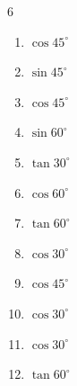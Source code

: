 \begin{multicols}{6}
\begin{enumerate}
  \item $\displaystyle \cos{45^\circ}$


  \item $\displaystyle \sin{45^\circ}$


  \item $\displaystyle \cos{45^\circ}$


\columnbreak %

\resetques

  \item $\displaystyle \sin{60^\circ}$


  \item $\displaystyle \tan{30^\circ}$


  \item $\displaystyle \cos{60^\circ}$


  \item $\displaystyle \tan{60^\circ}$


  \item $\displaystyle \cos{30^\circ}$


  \item $\displaystyle \cos{45^\circ}$


  \item $\displaystyle \cos{30^\circ}$


  \item $\displaystyle \cos{30^\circ}$


  \item $\displaystyle \tan{60^\circ}$



\end{enumerate}
\end{multicols}
